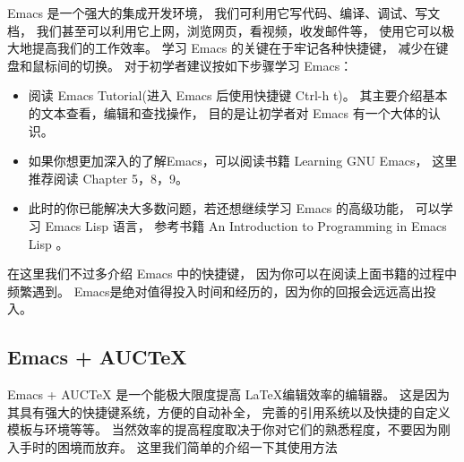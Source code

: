 
Emacs 是一个强大的集成开发环境，
我们可利用它写代码、编译、调试、写文档，
我们甚至可以利用它上网，浏览网页，看视频，收发邮件等，
使用它可以极大地提高我们的工作效率。
学习 Emacs 的关键在于牢记各种快捷键，
减少在键盘和鼠标间的切换。
对于初学者建议按如下步骤学习 Emacs：
\begin{itemize}
	\item 阅读 Emacs Tutorial(进入 Emacs 后使用快捷键 Ctrl-h t)。
		其主要介绍基本的文本查看，编辑和查找操作，
		目的是让初学者对 Emacs 有一个大体的认识。
	\item 如果你想更加深入的了解Emacs，可以阅读书籍 
		Learning GNU Emacs\cite{cameron1996learning}， 
		这里推荐阅读 Chapter 5，8，9。
	\item 此时的你已能解决大多数问题，若还想继续学习 Emacs 的高级功能，
		可以学习 Emacs Lisp 语言，
		参考书籍 An Introduction to Programming in Emacs Lisp
		\cite{chassell2004introduction}。
\end{itemize}
在这里我们不过多介绍 Emacs 中的快捷键，
因为你可以在阅读上面书籍的过程中频繁遇到。
Emacs是绝对值得投入时间和经历的，因为你的回报会远远高出投入。



\subsection{Emacs + AUCTeX}

Emacs + AUCTeX 是一个能极大限度提高 \LaTeX 编辑效率的编辑器。
这是因为其具有强大的快捷键系统，方便的自动补全，
完善的引用系统以及快捷的自定义模板与环境等等。
当然效率的提高程度取决于你对它们的熟悉程度，不要因为刚入手时的困境而放弃。
这里我们简单的介绍一下其使用方法


